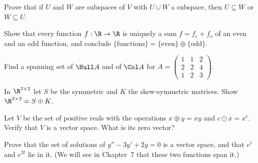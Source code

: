 \begin{exercise}
Prove that if $U$ and $W$ are subspaces of $V$ with $U\cup W$ a subspace, then $U\subseteq W$ or $W\subseteq U$.
\end{exercise}

\begin{exercise}
Show that every function $f:\R\to\R$ is uniquely a sum $f=f_e+f_o$ of an even and an odd function, and conclude $\{\text{functions}\}=\{\text{even}\}\oplus\{\text{odd}\}$.
\end{exercise}

\begin{exercise}
Find a spanning set of $\Null A$ and of $\Col A$ for $A=\begin{pmatrix}1&1&2\\2&2&4\\1&2&3\end{pmatrix}$.
\end{exercise}

\begin{exercise}
In $\R^{2\times2}$ let $S$ be the symmetric and $K$ the skew-symmetric matrices. Show $\R^{2\times2}=S\oplus K$.
\end{exercise}

\begin{exercise}
Let $V$ be the set of positive reals with the operations $x\oplus y=xy$ and $c\odot x=x^c$. Verify that $V$ is a vector space. What is its zero vector?
\end{exercise}

\begin{exercise}
Prove that the set of solutions of $y''-3y'+2y=0$ is a vector space, and that $e^t$ and $e^{2t}$ lie in it. (We will see in Chapter~7 that these two functions span it.)
\end{exercise}
